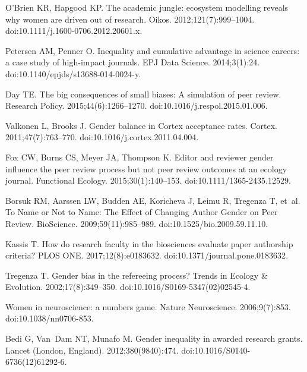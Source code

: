 \documentclass[10pt,letterpaper]{article}
\begin{document}
\begin{thebibliography}{100}
O{\textquoteright}Brien KR, Hapgood KP.
\newblock The academic jungle: ecosystem modelling reveals why women are driven
  out of research.
\newblock Oikos. 2012;121(7):999--1004.
\newblock doi:{10.1111/j.1600-0706.2012.20601.x}.

Petersen AM, Penner O.
\newblock Inequality and cumulative advantage in science careers: a case study
  of high-impact journals.
\newblock EPJ Data Science. 2014;3(1):24.
\newblock doi:{10.1140/epjds/s13688-014-0024-y}.

Day TE.
\newblock The big consequences of small biases: {A} simulation of peer review.
\newblock Research Policy. 2015;44(6):1266--1270.
\newblock doi:{10.1016/j.respol.2015.01.006}.

Valkonen L, Brooks J.
\newblock Gender balance in {Cortex} acceptance rates.
\newblock Cortex. 2011;47(7):763--770.
\newblock doi:{10.1016/j.cortex.2011.04.004}.

Fox CW, Burns CS, Meyer JA, Thompson K.
\newblock Editor and reviewer gender influence the peer review process but not
  peer review outcomes at an ecology journal.
\newblock Functional Ecology. 2015;30(1):140--153.
\newblock doi:{10.1111/1365-2435.12529}.

Borsuk RM, Aarssen LW, Budden AE, Koricheva J, Leimu R, Tregenza T, et~al.
\newblock To {Name} or {Not} to {Name}: {The} {Effect} of {Changing} {Author}
  {Gender} on {Peer} {Review}.
\newblock BioScience. 2009;59(11):985--989.
\newblock doi:{10.1525/bio.2009.59.11.10}.

Kassis T.
\newblock How do research faculty in the biosciences evaluate paper authorship
  criteria?
\newblock PLOS ONE. 2017;12(8):e0183632.
\newblock doi:{10.1371/journal.pone.0183632}.

Tregenza T.
\newblock Gender bias in the refereeing process?
\newblock Trends in Ecology \& Evolution. 2002;17(8):349--350.
\newblock doi:{10.1016/S0169-5347(02)02545-4}.

Women in neuroscience: a numbers game.
\newblock Nature Neuroscience. 2006;9(7):853.
\newblock doi:{10.1038/nn0706-853}.

Bedi G, Van~Dam NT, Munafo M.
\newblock Gender inequality in awarded research grants.
\newblock Lancet (London, England). 2012;380(9840):474.
\newblock doi:{10.1016/S0140-6736(12)61292-6}.


\end{thebibliography}
\end{document}
